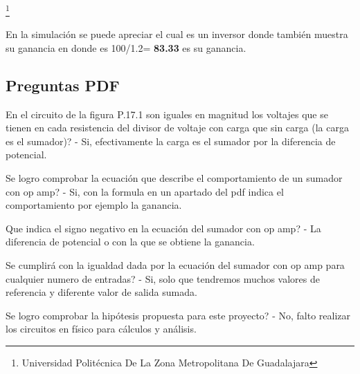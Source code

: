 \documentclass[10pt,a4paper]{article}
\begin{document}
\footnote{Universidad Politécnica De La Zona Metropolitana De Guadalajara} 

\newpage


En la simulación se puede apreciar el cual es un inversor donde también muestra su ganancia en donde es 100/1.2= \textbf{83.33} es su ganancia.


\subsection{Preguntas PDF}

En el circuito de la figura P.17.1 son iguales en magnitud los voltajes que se tienen en cada resistencia del divisor de voltaje con carga que sin carga (la carga es el sumador)? - Si, efectivamente la carga es el sumador por la diferencia de potencial. 

Se logro comprobar la ecuación que describe el comportamiento de un sumador con op amp? - Si, con la formula en un apartado del pdf indica el comportamiento por ejemplo la ganancia.

Que indica el signo negativo en la ecuación del sumador con op amp? - La diferencia de potencial o con la que se obtiene la ganancia.

Se cumplirá con la igualdad dada por la ecuación del sumador con op amp para cualquier numero de entradas? - Si, solo que tendremos muchos valores de referencia y diferente valor de salida sumada.

Se logro comprobar la hipótesis propuesta para este proyecto? - No, falto realizar los circuitos en físico para cálculos y análisis.
\end{document}
